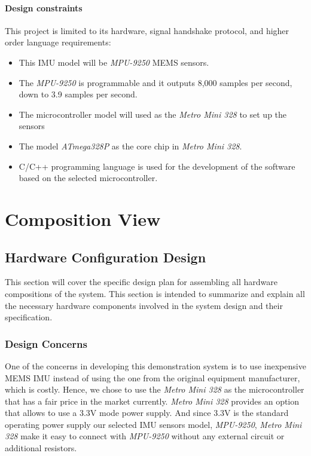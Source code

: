 		\paragraph{Design constraints} This project is limited to its hardware, signal handshake protocol, and higher order language requirements:
		\begin{itemize}
			\item This IMU model will be \textit{MPU-9250} MEMS sensors. 
			\item The \textit{MPU-9250} is programmable and it outputs 8,000 samples per second, down to 3.9 samples per second.
			\item The microcontroller model will used as the \textit{Metro Mini 328} to set up the sensors
			\item The model \textit{ATmega328P} as the core chip in \textit{Metro Mini 328}.
			\item C/C++ programming language is used for the development of the software based on the selected microcontroller.
		\end{itemize}


\section{Composition View}
	\subsection{Hardware Configuration Design}
	This section will cover the specific design plan for assembling all hardware compositions of the system. This section is intended to summarize and explain all the necessary hardware components involved in the system design and their specification.\\

		\subsubsection{Design Concerns}
		One of the concerns in developing this demonstration system is to use inexpensive MEMS IMU instead of using the one from the original equipment manufacturer, which is costly. Hence, we chose to use the \textit{Metro Mini 328} as the microcontroller that has a fair price in the market currently. \textit{Metro Mini 328} provides an option that allows to use a 3.3V mode power supply. And since 3.3V is the standard operating power supply our selected IMU sensors model, \textit{MPU-9250}, \textit{Metro Mini 328} make it easy to connect with \textit{MPU-9250} without any external circuit or additional resistors.\\

